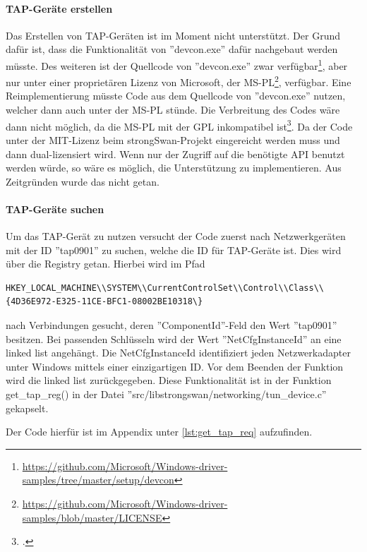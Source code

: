 {\paragraph{TAP-Geräte erstellen}
Das Erstellen von TAP-Geräten ist im Moment nicht unterstützt. Der Grund dafür ist,
dass die Funktionalität von ''devcon.exe'' dafür nachgebaut werden müsste.
Des weiteren ist der Quellcode von ''devcon.exe'' zwar verfügbar\footnote{\url{https://github.com/Microsoft/Windows-driver-samples/tree/master/setup/devcon}},
aber nur unter einer proprietären Lizenz von Microsoft, der MS-PL\footnote{\url{https://github.com/Microsoft/Windows-driver-samples/blob/master/LICENSE}},
verfügbar. Eine Reimplementierung müsste Code aus dem Quellcode von ''devcon.exe'' nutzen,
welcher dann auch unter der MS-PL stünde. Die Verbreitung des Codes wäre dann nicht möglich,
da die MS-PL mit der GPL inkompatibel ist\footcite[][]{_gnu.org_2016}.
Da der Code unter der MIT-Lizenz beim strongSwan-Projekt eingereicht werden muss
und dann dual-lizensiert wird.
Wenn nur der Zugriff auf die benötigte API benutzt werden würde, so wäre es möglich,
die Unterstützung zu implementieren. Aus Zeitgründen wurde das nicht getan.

\paragraph{TAP-Geräte suchen}
Um das TAP-Gerät zu nutzen versucht der Code zuerst nach Netzwerkgeräten mit der ID ''tap0901'' zu suchen,
welche die ID für TAP-Geräte ist. Dies wird über die Registry getan. Hierbei wird
im Pfad \begin{lstlisting}[numbers=none]
HKEY_LOCAL_MACHINE\\SYSTEM\\CurrentControlSet\\Control\\Class\\{4D36E972-E325-11CE-BFC1-08002BE10318\}
\end{lstlisting}
nach Verbindungen gesucht, deren ''ComponentId''-Feld den Wert ''tap0901'' besitzen.
Bei passenden Schlüsseln wird der Wert ''NetCfgInstanceId'' an eine linked list
angehängt. Die NetCfgInstanceId identifiziert jeden Netzwerkadapter unter Windows
mittels einer einzigartigen ID.
Vor dem Beenden der Funktion wird die linked list zurückgegeben.
Diese Funktionalität ist in der Funktion get\_tap\_reg() in der Datei
''src/libstrongswan/networking/tun\_device.c'' gekapselt.

Der Code hierfür ist im Appendix unter \autoref{lst:get_tap_req} aufzufinden.

}
